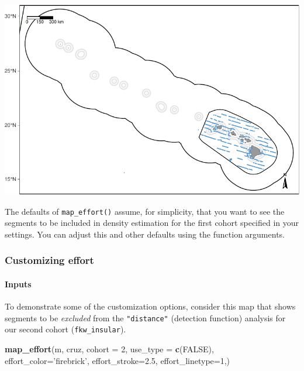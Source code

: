 \documentclass[
]{book}
\newenvironment{Shaded}{\begin{snugshade}}{\end{snugshade}}
\newcommand{\DataTypeTok}[1]{\textcolor[rgb]{0.13,0.29,0.53}{#1}}
\newcommand{\DecValTok}[1]{\textcolor[rgb]{0.00,0.00,0.81}{#1}}
\newcommand{\FloatTok}[1]{\textcolor[rgb]{0.00,0.00,0.81}{#1}}
\newcommand{\KeywordTok}[1]{\textcolor[rgb]{0.13,0.29,0.53}{\textbf{#1}}}
\newcommand{\NormalTok}[1]{#1}
\newcommand{\OtherTok}[1]{\textcolor[rgb]{0.56,0.35,0.01}{#1}}
\newcommand{\StringTok}[1]{\textcolor[rgb]{0.31,0.60,0.02}{#1}}
\begin{document}
\includegraphics{figures/unnamed-chunk-54-1.pdf}

The defaults of \texttt{map\_effort()} assume, for simplicity, that you want to see the segments to be included in density estimation for the first cohort specified in your settings. You can adjust this and other defaults using the function arguments.

\hypertarget{customizing-effort}{%
\subsubsection*{Customizing effort}\label{customizing-effort}}

\hypertarget{inputs}{%
\paragraph{Inputs}\label{inputs}}

To demonstrate some of the customization options, consider this map that shows segments to be \emph{excluded} from the \texttt{"distance"} (detection function) analysis for our second cohort (\texttt{fkw\_insular}).

\begin{Shaded}
\begin{Highlighting}[]
\KeywordTok{map_effort}\NormalTok{(m, cruz,}
           \DataTypeTok{cohort =} \DecValTok{2}\NormalTok{,}
           \DataTypeTok{use_type =} \KeywordTok{c}\NormalTok{(}\OtherTok{FALSE}\NormalTok{),}
           \DataTypeTok{effort_color=}\StringTok{'firebrick'}\NormalTok{,}
           \DataTypeTok{effort_stroke=}\FloatTok{2.5}\NormalTok{,}
           \DataTypeTok{effort_linetype=}\DecValTok{1}\NormalTok{,)}
\end{Highlighting}
\end{Shaded}
\end{document}
